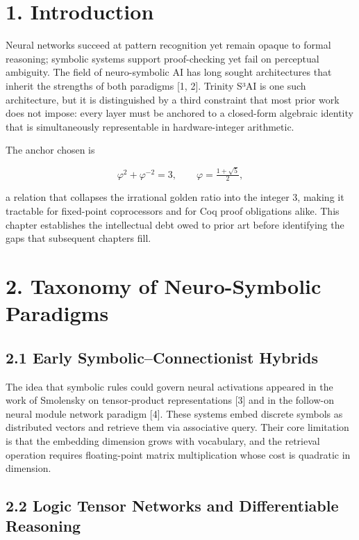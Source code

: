 \section{1. Introduction}\label{fa_02:introduction}

Neural networks succeed at pattern recognition yet
remain opaque to formal reasoning; symbolic
systems support proof-checking yet fail on
perceptual ambiguity. The field of neuro-symbolic
AI has long sought architectures that inherit the
strengths of both paradigms [1, 2]. Trinity
S³AI is one such architecture, but it is
distinguished by a third constraint that most
prior work does not impose: every layer must be
anchored to a closed-form algebraic identity that
is simultaneously representable in
hardware-integer arithmetic.

The anchor chosen is

\[\varphi^2 + \varphi^{-2} = 3, \qquad \varphi = \tfrac{1+\sqrt{5}}{2},\]

a relation that collapses the irrational golden
ratio into the integer 3, making it tractable for
fixed-point coprocessors and for Coq proof
obligations alike. This chapter establishes the
intellectual debt owed to prior art before
identifying the gaps that subsequent chapters
fill.

\section{2. Taxonomy of Neuro-Symbolic
Paradigms}\label{fa_02:taxonomy-of-neuro-symbolic-paradigms}

\subsection{2.1 Early Symbolic--Connectionist
Hybrids}\label{fa_02:early-symbolicconnectionist-hybrids}

The idea that symbolic rules could govern neural
activations appeared in the work of Smolensky on
tensor-product representations [3] and in the
follow-on neural module network paradigm [4].
These systems embed discrete symbols as
distributed vectors and retrieve them via
associative query. Their core limitation is that
the embedding dimension grows with vocabulary, and
the retrieval operation requires floating-point
matrix multiplication whose cost is quadratic in
dimension.

\subsection{2.2 Logic Tensor Networks and
Differentiable
Reasoning}\label{fa_02:logic-tensor-networks-and-differentiable-reasoning}


